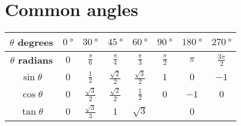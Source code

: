 \section*{Common angles}

\begin{table}[!ht]
\setlength{\tabcolsep}{1em} %
\centering
  \begin{tabular}{|c|c|c|c|c|c|c|c|}
    \hline
    \textbf{$\theta$ degrees}
      & $\SI{0}{\degree}$
      & $\SI{30}{\degree}$
      & $\SI{45}{\degree}$
      & $\SI{60}{\degree}$
      & $\SI{90}{\degree}$
      & $\SI{180}{\degree}$
      & $\SI{270}{\degree}$ \\
    \hline
    \textbf{$\theta$ radians}
      & $0$
      & $\frac{\pi}{6}$
      & $\frac{\pi}{4}$
      & $\frac{\pi}{3}$
      & $\frac{\pi}{2}$
      & $\pi$
      & $\frac{3\pi}{2}$ \\
    \hline
    \textbf{$\sin \theta$}
      & $0$
      & $\frac{1}{2}$
      & $\frac{\sqrt 2}{2}$
      & $\frac{\sqrt 3}{2}$
      & $1$
      & $0$
      & $-1$ \\
    \hline
    \textbf{$\cos \theta$}
      & $0$
      & $\frac{\sqrt 3}{2}$
      & $\frac{\sqrt 2}{2}$
      & $\frac{1}{2}$
      & $0$
      & $-1$
      & $0$ \\
    \hline
    \textbf{$\tan \theta$}
      & $0$
      & $\frac{\sqrt 3}{3}$
      & $1$
      & $\sqrt 3$
      &
      & $0$
      &  \\
    \hline
  \end{tabular}
\end{table}